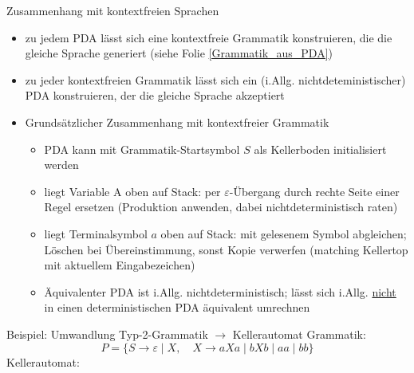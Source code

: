 \begin{frame}{Zusammenhang mit kontextfreien Sprachen}
	\begin{itemize}
		\item zu jedem PDA lässt sich eine kontextfreie Grammatik konstruieren, die die gleiche Sprache generiert (siehe Folie \ref{Grammatik_aus_PDA})
		\item zu jeder kontextfreien Grammatik lässt sich ein (i.Allg. nichtdeteministischer) PDA konstruieren, der die gleiche Sprache akzeptiert
		\item Grundsätzlicher Zusammenhang mit kontextfreier Grammatik
		\begin{itemize}
			\item PDA kann mit Grammatik-Startsymbol $S$ als Kellerboden initialisiert werden
			\item liegt Variable A oben auf Stack: per $\varepsilon$-Übergang durch rechte Seite einer Regel ersetzen (Produktion anwenden, dabei nichtdeterministisch raten)
			\item liegt Terminalsymbol $a$ oben auf Stack: mit gelesenem Symbol abgleichen; Löschen bei Übereinstimmung, sonst Kopie verwerfen (matching Kellertop mit aktuellem Eingabezeichen)
			\item Äquivalenter PDA ist i.Allg. nichtdeterministisch; lässt sich i.Allg. \underline{nicht} in einen deterministischen PDA äquivalent umrechnen
		\end{itemize}
	\end{itemize}
\end{frame}


\begin{frame}{Beispiel: Umwandlung Typ-2-Grammatik $\rightarrow$ Kellerautomat}
	Grammatik:
	$$P=\{ S\rightarrow \varepsilon \mid X, \quad X \rightarrow aXa\mid bXb \mid aa \mid bb\}$$
	Kellerautomat:\\
	\centering
\end{frame}

